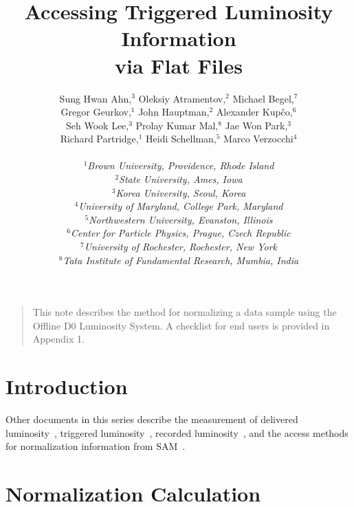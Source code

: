 \documentclass[12pt]{article}
\begin{document}
\title{Accessing Triggered Luminosity Information \\ via Flat Files}
\author{Sung Hwan Ahn,$^3$
    Oleksiy Atramentov,$^2$
    Michael Begel,$^7$ \\
    Gregor Geurkov,$^1$
    John Hauptman,$^2$
    Alexander Kup\v{c}o,$^6$ \\
    Seh Wook Lee,$^3$
    Prolay Kumar Mal,$^8$
    Jae Won Park,$^3$ \\
    Richard Partridge,$^1$
    Heidi Schellman,$^5$
    Marco Verzocchi$^4$
\\
\\ $^1${\it\small Brown University, Providence, Rhode Island}
\\ $^2${\it\small State University, Ames, Iowa}
\\ $^3${\it\small Korea University, Seoul, Korea}
\\ $^4${\it\small University of Maryland, College Park, Maryland}
\\ $^5${\it\small Northwestern University, Evanston, Illinois}
\\ $^6${\it\small Center for Particle Physics, Prague, Czech Republic}
\\ $^7${\it\small University of Rochester, Rochester, New York}
\\ $^8${\it\small Tata Institute of Fundamental Research, Mumbia, India}
}
\maketitle
\thispagestyle{myheadings}

\begin{quote}
This note describes the method for normalizing a data sample using the
Offline D0 Luminosity System.  A checklist for end users is provided
in Appendix 1.
\end{quote}

\section{Introduction}

Other documents in this series describe the measurement of delivered
luminosity~\cite{3970}, triggered luminosity~\cite{3971}, recorded
luminosity~\cite{3972}, and the access methods for normalization
information from SAM~\cite{3465,3937}.

\section{Normalization Calculation}
\end{document}
